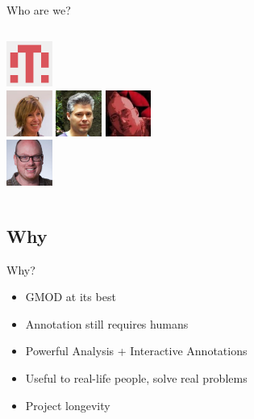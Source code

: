 \documentclass[12pt]{phage3slides} %
\begin{document}
\begin{frame}{Who are we?}
\begin{columns}
\begin{column}{0.48\textwidth}
            \includegraphics[width=1.5cm]{people/moffmade} \\
            \includegraphics[width=1.5cm]{people/selewis}
            \includegraphics[width=1.5cm]{people/nathandunn}
            \includegraphics[width=1.5cm]{people/pvanheus} \\
            \includegraphics[width=1.5cm]{people/tseemann}
        \end{column}
    \end{columns}
\end{frame}

\subsection{Why}
\begin{frame}{Why?}
    \begin{itemize}
        \item GMOD at its best
        \item Annotation still requires humans
        \item Powerful Analysis + Interactive Annotations
        \item Useful to real-life people, solve real problems
        \item Project longevity
    \end{itemize}
\end{frame}
\end{document}
